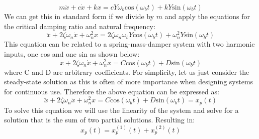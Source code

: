\documentclass[12pt,a4paper]{article}
\begin{document}
\begin{equation}
m\ddot{x} + c\dot{x} + kx = c Y \omega_b \text{cos}(\omega_b t)  + k Y\text{sin}(\omega_b t)  
\end{equation}
We can get this in standard form if we divide by $m$ and apply the equations for the critical damping ratio and natural frequency:
\begin{equation}
\ddot{x} + 2 \zeta \omega_n \dot{x} + \omega_n^2x = 2 \zeta \omega_n \omega_b Y \text{cos}(\omega_b t)  + \omega_n^2 Y\text{sin}(\omega_b t)  
\end{equation}
This equation can be related to a spring-mass-damper system with two harmonic inputs, one cos and one sin as shown below:
\begin{equation}
\ddot{x} + 2 \zeta \omega_n \dot{x} + \omega_n^2x = C \text{cos}(\omega_b t)  + D \text{sin}(\omega_b t)  
\end{equation}
where C and D are arbitrary coefficients. For simplicity, let us just consider the steady-state solution as this is often of more importance when designing systems for continuous use. Therefore the above equation can be expressed as:
\begin{equation}
\ddot{x} + 2 \zeta \omega_n \dot{x} + \omega_n^2x = C \text{cos}(\omega_b t)  + D \text{sin}(\omega_b t)  = x_p(t) 
\end{equation}
To solve this equation we will use the linearity of the system and solve for a solution that is the sum of two partial solutions. Resulting in:
\begin{equation}
 x_p(t) = 	x_p^{(1)}(t) + 	x_p^{(2)}(t)  
\end{equation}
\end{document}
